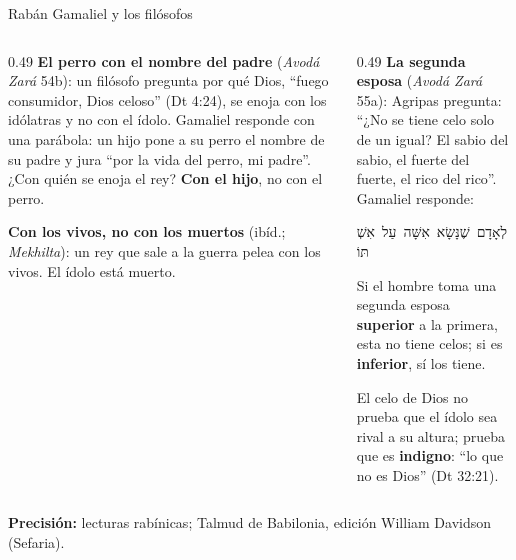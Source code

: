 \documentclass[hyperref={bookmarks=false},aspectratio=169]{beamer}
\newcommand{\heb}[1]{\mbox{\foreignlanguage{hebrew}{#1}}}
\newcommand{\destacar}[1]{\textbf{\textcolor{azul}{#1}}}
\newcommand{\precision}[1]{{\footnotesize\color{gris}\textbf{Precisión:} #1}}
\begin{document}
\begin{frame}{Rabán Gamaliel y los filósofos}
\begin{columns}[t,onlytextwidth]
\begin{column}{0.49\textwidth}\scriptsize
\textbf{El perro con el nombre del padre} (\emph{Avodá Zará} 54b): un filósofo pregunta por qué Dios, ``fuego consumidor, Dios celoso'' (Dt 4:24), se enoja con los idólatras y no con el ídolo. Gamaliel responde con una parábola: un hijo pone a su perro el nombre de su padre y jura ``por la vida del perro, mi padre''. ¿Con quién se enoja el rey? \destacar{Con el hijo}, no con el perro.\par\smallskip
\textbf{Con los vivos, no con los muertos} (ibíd.; \emph{Mekhilta}): un rey que sale a la guerra pelea con los vivos. El ídolo está muerto.
\end{column}
\begin{column}{0.49\textwidth}\scriptsize
\textbf{La segunda esposa} (\emph{Avodá Zará} 55a): Agripas pregunta: ``¿No se tiene celo solo de un igual? El sabio del sabio, el fuerte del fuerte, el rico del rico''. Gamaliel responde:
\begin{center}\heb{לְאָדָם שֶׁנָּשָׂא אִשָּׁה עַל אִשְׁתּוֹ}\end{center}
Si el hombre toma una segunda esposa \destacar{superior} a la primera, esta no tiene celos; si es \destacar{inferior}, sí los tiene.\par\smallskip
El celo de Dios no prueba que el ídolo sea rival a su altura; prueba que es \destacar{indigno}: ``lo que no es Dios'' (Dt 32:21).
\end{column}
\end{columns}\par\smallskip
\precision{lecturas rabínicas; Talmud de Babilonia, edición William Davidson (Sefaria).}
\end{frame}
\end{document}
